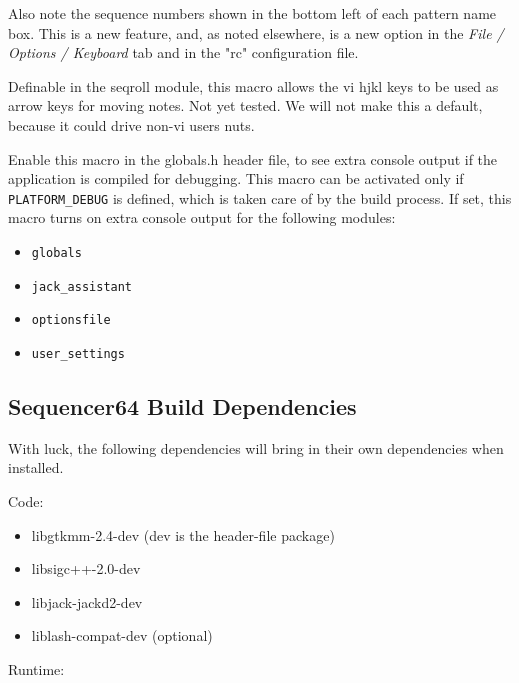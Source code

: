       Also note the sequence numbers shown in the bottom left of each pattern
      name box. This is a new feature, and, as noted elsewhere, is a new
      option in the \textsl{File / Options / Keyboard} tab and in
      the "rc" configuration file.

        Definable in the seqroll module, this macro allows the vi hjkl keys to
        be used as arrow keys for moving notes.  Not yet tested.  We will not
        make this a default, because it could drive non-vi users nuts.

        Enable this macro in the globals.h header file, to see extra console
        output if the application is compiled for debugging.  This macro can be
        activated only if \texttt{PLATFORM\_DEBUG} is defined, which is taken
        care of by the build process.  If set, this macro turns on extra
        console output for the following modules:

        \begin{itemize}
           \item \texttt{globals}
           \item \texttt{jack\_assistant}
           \item \texttt{optionsfile}
           \item \texttt{user\_settings}
        \end{itemize}

\subsection{Sequencer64 Build Dependencies}
\label{subsec:seq64_build_dependencies}

   With luck, the following dependencies will bring in their own
   dependencies when installed.

   Code:

     \begin{itemize}
        \item libgtkmm-2.4-dev (dev is the header-file package)
        \item libsigc++-2.0-dev
        \item libjack-jackd2-dev
        \item liblash-compat-dev (optional)
     \end{itemize}

   Runtime:

